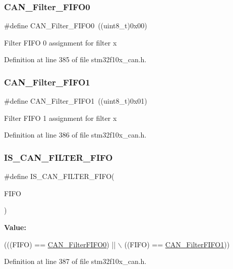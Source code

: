 \subsubsection{\texorpdfstring{C\+A\+N\+\_\+\+Filter\+\_\+\+F\+I\+F\+O0}{CAN\_Filter\_FIFO0}}
{\footnotesize\ttfamily \#define C\+A\+N\+\_\+\+Filter\+\_\+\+F\+I\+F\+O0~((uint8\+\_\+t)0x00)}

Filter F\+I\+FO 0 assignment for filter x 

Definition at line 385 of file stm32f10x\+\_\+can.\+h.

\mbox{\label{group___c_a_n__filter___f_i_f_o_gaab8478c89a607c4b8baf68efc730e316}} 
\subsubsection{\texorpdfstring{C\+A\+N\+\_\+\+Filter\+\_\+\+F\+I\+F\+O1}{CAN\_Filter\_FIFO1}}
{\footnotesize\ttfamily \#define C\+A\+N\+\_\+\+Filter\+\_\+\+F\+I\+F\+O1~((uint8\+\_\+t)0x01)}

Filter F\+I\+FO 1 assignment for filter x 

Definition at line 386 of file stm32f10x\+\_\+can.\+h.

\mbox{\label{group___c_a_n__filter___f_i_f_o_ga2df5ae0de841fc80c969e9147991ec9d}} 
\subsubsection{\texorpdfstring{I\+S\+\_\+\+C\+A\+N\+\_\+\+F\+I\+L\+T\+E\+R\+\_\+\+F\+I\+FO}{IS\_CAN\_FILTER\_FIFO}}
{\footnotesize\ttfamily \#define I\+S\+\_\+\+C\+A\+N\+\_\+\+F\+I\+L\+T\+E\+R\+\_\+\+F\+I\+FO(\begin{DoxyParamCaption}\item[{}]{F\+I\+FO }\end{DoxyParamCaption})}

{\bfseries Value\+:}
\begin{DoxyCode}
(((FIFO) == \hyperlink{group___c_a_n___legacy_ga1b3d041dff9fed4dad75ed2a4a0e27e0}{CAN\_FilterFIFO0}) || \(\backslash\)
                                  ((FIFO) == \hyperlink{group___c_a_n___legacy_gada8f9b3a9c88f36539aaeb457039e666}{CAN\_FilterFIFO1}))
\end{DoxyCode}


Definition at line 387 of file stm32f10x\+\_\+can.\+h.

